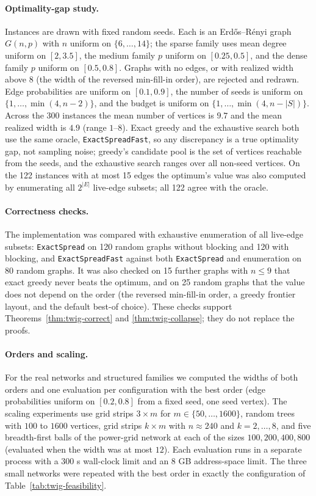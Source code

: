 \documentclass[11pt]{article}
\theoremstyle{definition}
\theoremstyle{remark}
\begin{document}
\paragraph{Optimality-gap study.} Instances are drawn with fixed random seeds. Each is an Erd\H{o}s--R\'enyi graph $G(n,p)$ with $n$ uniform on $\{6,\dots,14\}$; the sparse family uses mean degree uniform on $[2,3.5]$, the medium family $p$ uniform on $[0.25,0.5]$, and the dense family $p$ uniform on $[0.5,0.8]$. Graphs with no edges, or with realized width above $8$ (the width of the reversed min-fill-in order), are rejected and redrawn. Edge probabilities are uniform on $[0.1,0.9]$, the number of seeds is uniform on $\{1,\dots,\min(4,n-2)\}$, and the budget is uniform on $\{1,\dots,\min(4,n-|S|)\}$. Across the 300 instances the mean number of vertices is $9.7$ and the mean realized width is $4.9$ (range $1$--$8$). Exact greedy and the exhaustive search both use the same oracle, \texttt{ExactSpreadFast}, so any discrepancy is a true optimality gap, not sampling noise; greedy's candidate pool is the set of vertices reachable from the seeds, and the exhaustive search ranges over all non-seed vertices. On the 122 instances with at most 15 edges the optimum's value was also computed by enumerating all $2^{|E|}$ live-edge subsets; all 122 agree with the oracle.

\paragraph{Correctness checks.} The implementation was compared with exhaustive enumeration of all live-edge subsets: \texttt{ExactSpread} on 120 random graphs without blocking and 120 with blocking, and \texttt{ExactSpreadFast} against both \texttt{ExactSpread} and enumeration on 80 random graphs. It was also checked on 15 further graphs with $n\le9$ that exact greedy never beats the optimum, and on 25 random graphs that the value does not depend on the order (the reversed min-fill-in order, a greedy frontier layout, and the default best-of choice). These checks support Theorems~\ref{thm:twig-correct} and \ref{thm:twig-collapse}; they do not replace the proofs.

\paragraph{Orders and scaling.} For the real networks and structured families we computed the widths of both orders and one evaluation per configuration with the best order (edge probabilities uniform on $[0.2,0.8]$ from a fixed seed, one seed vertex). The scaling experiments use grid strips $3\times m$ for $m\in\{50,\dots,1600\}$, random trees with $100$ to $1600$ vertices, grid strips $k\times m$ with $n\approx240$ and $k=2,\dots,8$, and five breadth-first balls of the power-grid network at each of the sizes $100,200,400,800$ (evaluated when the width was at most $12$). Each evaluation runs in a separate process with a 300 s wall-clock limit and an 8 GB address-space limit. The three small networks were repeated with the best order in exactly the configuration of Table~\ref{tab:twig-feasibility}.
\end{document}
